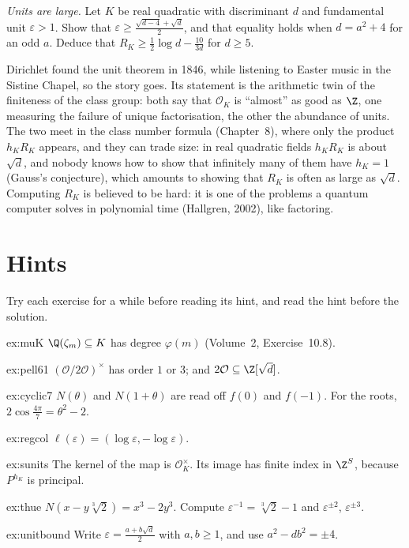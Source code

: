 \begin{exercise}[$\star\star\star$]\label{ex:unitbound}
\emph{Units are large.} Let $K$ be real quadratic with discriminant $d$ and fundamental unit $\varepsilon>1$. Show that
$\varepsilon\ge\frac{\sqrt{d-4}+\sqrt d}2$, and that equality holds when $d=a^2+4$ for an odd $a$. Deduce that
$R_K\ge\frac12\log d-\frac{10}{3d}$ for $d\ge5$.
\end{exercise}

\begin{beauty}
Dirichlet found the unit theorem in 1846, while listening to Easter music in the Sistine Chapel, so the story goes. Its
statement is the arithmetic twin of the finiteness of the class group: both say that $\mathcal O_K$ is ``almost'' as good as
$\Z$, one measuring the failure of unique factorisation, the other the abundance of units. The two meet in the class
number formula (Chapter~8), where only the product $h_KR_K$ appears, and they can trade size: in real quadratic fields
$h_KR_K$ is about $\sqrt d$, and nobody knows how to show that infinitely many of them have $h_K=1$ (Gauss's conjecture), which
amounts to showing that $R_K$ is often as large as $\sqrt d$. Computing $R_K$ is believed to be hard: it is one of the
problems a quantum computer solves in polynomial time (Hallgren, 2002), like factoring.
\end{beauty}

\section{Hints}

Try each exercise for a while before reading its hint, and read the hint before the solution.

\begin{hint}{ex:muK}
$\Q(\zeta_m)\subseteq K$ has degree $\varphi(m)$ (Volume~2, Exercise~10.8).
\end{hint}
\begin{hint}{ex:pell61}
$(\mathcal O/2\mathcal O)^\times$ has order $1$ or $3$; and $2\mathcal O\subseteq\Z[\sqrt d]$.
\end{hint}
\begin{hint}{ex:cyclic7}
$N(\theta)$ and $N(1+\theta)$ are read off $f(0)$ and $f(-1)$. For the roots, $2\cos\frac{4\pi}7=\theta^2-2$.
\end{hint}
\begin{hint}{ex:regcol}
$\ell(\varepsilon)=(\log\varepsilon,-\log\varepsilon)$.
\end{hint}
\begin{hint}{ex:sunits}
The kernel of the map is $\mathcal O_K^\times$. Its image has finite index in $\Z^S$, because $P^{h_K}$ is principal.
\end{hint}
\begin{hint}{ex:thue}
$N(x-y\sqrt[3]2)=x^3-2y^3$. Compute $\varepsilon^{-1}=\sqrt[3]2-1$ and $\varepsilon^{\pm2}$, $\varepsilon^{\pm3}$.
\end{hint}
\begin{hint}{ex:unitbound}
Write $\varepsilon=\frac{a+b\sqrt d}2$ with $a,b\ge1$, and use $a^2-db^2=\pm4$.
\end{hint}

